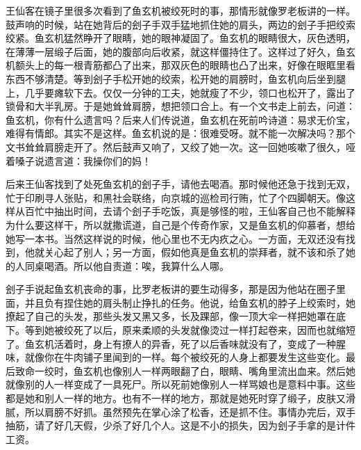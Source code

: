 王仙客在镜子里很多次看到了鱼玄机被绞死时的事，那情形就像罗老板讲的一样。鼓声响的时候，站在她背后的刽子手双手猛地抓住她的肩头，两边的刽子手把绞索绞紧。鱼玄机猛然睁开了眼睛，她的眼神凝固了。鱼玄机的眼睛很大，灰色透明，在薄薄一层缎子后面，她的腹部向后收紧，就这样僵持住了。这样过了好久，鱼玄机额头上的每一根青筋都凸了出来，那双灰色的眼睛也凸了出来，好像在眼眶里看东西不够清楚。等到刽子手松开她的绞索，松开她的肩膀时，鱼玄机向后坐到腿上，几乎要瘫软下去。仅仅一分钟的工夫，她就瘦了不少，领口也松开了，露出了锁骨和大半乳房。于是她耸耸肩膀，想把领口合上。有一个文书走上前去，问道：鱼玄机，你有什么遗言吗？后来人们传说道，鱼玄机在死前吟诗道：易求无价宝，难得有情郎。其实不是这样。鱼玄机说的是：很难受呀。就不能一次解决吗？那个文书耸耸肩膀走开了。然后鼓声又响了，又绞了她一次。这一回她咳嗽了很久，哑着嗓子说遗言道：我操你们的妈！ 

后来王仙客找到了处死鱼玄机的刽子手，请他去喝酒。那时候他还急于找到无双，忙于印刷寻人张贴，和黑社会联络，向京城的巡检司行贿，忙了个四脚朝天。像这样从百忙中抽出时间，去请个刽子手吃饭，真是够怪的啦，王仙客自己也不能解释为什么要这样干，所以就撒谎道，自己是个传奇作家，又是鱼玄机的仰慕者，想给她写一本书。当然这样说的时候，他心里也不无内疚之心。一方面，无双还没有找到，他就关心起了别人；另一方面，假如他真是鱼玄机的崇拜者，就不该和杀了她的人同桌喝酒。所以他自责道：唉，我算什么人哪。 

刽子手说起鱼玄机丧命的事，比罗老板讲的要生动得多，那是因为他站在圈子里面，并且负有捏住她的肩头制止挣扎的任务。他说，给鱼玄机的脖子上绞索时，她撩起了自己的头发，那些头发又黑又多，长及踝部，像一顶大伞一样把她罩在底下。等到她被绞死了以后，原来柔顺的头发就像烫过一样打起卷来，因而也就缩短了。鱼玄机活着时，身上有撩人的异香，死了以后香味就没有了，变成了一种腥味，就像你在牛肉铺子里闻到的一样。每个被绞死的人身上都要发生这些变化。最后致命一绞时，鱼玄机也像别人一样两眼翻了白，眼睛、嘴角里流出血来。然后她就像别的人一样变成了一具死尸。所以死前她像别人一样骂娘也是意料中事。这些都是她和别人一样的地方。也有不一样的地方，那就是她死时穿了缎子，皮肤又滑腻，所以肩膀不好抓。虽然预先在掌心涂了松香，还是抓不住。事情办完后，双手抽筋，请了好几天假，少杀了好几个人。这是不小的损失，因为刽子手拿的是计件工资。 

